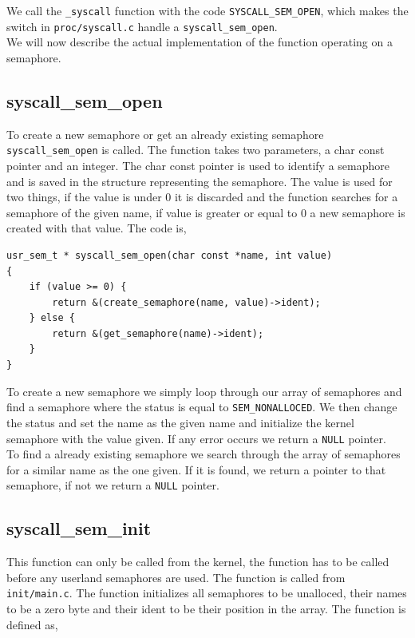 \documentclass[11pt]{article}
\begin{document}
    We call the \texttt{\_syscall} function with the code
    \texttt{SYSCALL\_SEM\_OPEN}, which makes the switch in
    \texttt{proc/syscall.c} handle a \texttt{syscall\_sem\_open}. \\

    We will now describe the actual implementation of the function operating on
    a semaphore.

    \subsection{syscall\_sem\_open}
    To create a new semaphore or get an already existing semaphore
    \texttt{syscall\_sem\_open} is called.  The function takes two parameters,
    a char const pointer and an integer.  The char const pointer is used to
    identify a semaphore and is saved in the structure representing the
    semaphore.  The value is used for two things, if the value is under 0 it is
    discarded and the function searches for a semaphore of the given name, if
    value is greater or equal to 0 a new semaphore is created with that value.
    The code is,

    \begin{lstlisting}[style=customc]
usr_sem_t * syscall_sem_open(char const *name, int value)
{
    if (value >= 0) {
        return &(create_semaphore(name, value)->ident);
    } else {
        return &(get_semaphore(name)->ident);
    }
}
    \end{lstlisting}

    To create a new semaphore we simply loop through our array of semaphores and
    find a semaphore where the status is equal to \texttt{SEM\_NONALLOCED}.  We
    then change the status and set the name as the given name and initialize the
    kernel semaphore with the value given.  If any error occurs we return a
    \texttt{NULL} pointer. \\

    To find a already existing semaphore we search through the array of
    semaphores for a similar name as the one given.  If it is found, we return
    a pointer to that semaphore, if not we return a \texttt{NULL} pointer.

    \subsection{syscall\_sem\_init}
    This function can only be called from the kernel, the function has to be
    called before any userland semaphores are used.  The function is called from
    \texttt{init/main.c}.  The function initializes all semaphores to be
    unalloced, their names to be a zero byte and their ident to be their
    position in the array.  The function is defined as,
\end{document}
